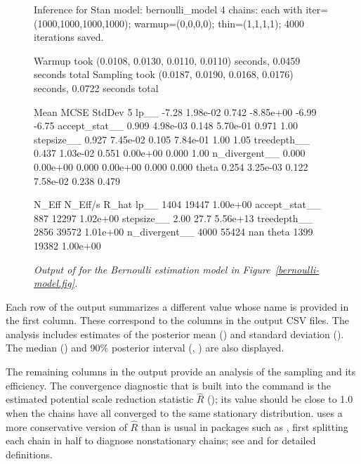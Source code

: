 \documentclass[article]{jss}
\begin{document}
\begin{figure}
\begin{Code}
Inference for Stan model: bernoulli_model
4 chains: each with iter=(1000,1000,1000,1000); warmup=(0,0,0,0); 
                    thin=(1,1,1,1); 4000 iterations saved.

Warmup took (0.0108, 0.0130, 0.0110, 0.0110) seconds, 0.0459 seconds total
Sampling took (0.0187, 0.0190, 0.0168, 0.0176) seconds, 0.0722 seconds total

                 Mean      MCSE  StdDev         5%
lp__            -7.28  1.98e-02   0.742  -8.85e+00  -6.99  -6.75
accept_stat__   0.909  4.98e-03   0.148   5.70e-01  0.971   1.00
stepsize__      0.927  7.45e-02   0.105   7.84e-01   1.00   1.05
treedepth__     0.437  1.03e-02   0.551   0.00e+00  0.000   1.00
n_divergent__   0.000  0.00e+00   0.000   0.00e+00  0.000  0.000
theta           0.254  3.25e-03   0.122   7.58e-02  0.238  0.479

                N_Eff  N_Eff/s     R_hat
lp__             1404    19447  1.00e+00
accept_stat__     887    12297  1.02e+00
stepsize__       2.00     27.7  5.56e+13
treedepth__      2856    39572  1.01e+00
n_divergent__    4000    55424       nan
theta            1399    19382  1.00e+00
\end{Code}
\caption{\it Output of  for the Bernoulli estimation model in
  Figure~\ref{bernoulli-model.fig}.}\label{print-output.fig}
\end{figure}
%
Each row of the output summarizes a different value whose name is
provided in the first column.  These correspond to the columns in the
output CSV files. The analysis includes estimates of the posterior
mean () and standard deviation ().  The median
() and 90\% posterior interval (, )
are also displayed.  

The remaining columns in the output provide an analysis of the
sampling and its efficiency.  The convergence diagnostic that is built
into the  command is the estimated potential scale
reduction statistic $\hat{R}$ (); its value should be close
to 1.0 when the chains have all converged to the same stationary
distribution.   uses a more conservative version of
$\hat{R}$ than is usual in packages such as 
\citep{PlummerEtAl:2006}, first splitting each chain in half to
diagnose nonstationary chains; see \citep{GelmanEtAl:2013} and
\citep{Stan:2013} for detailed definitions.
\end{document}
